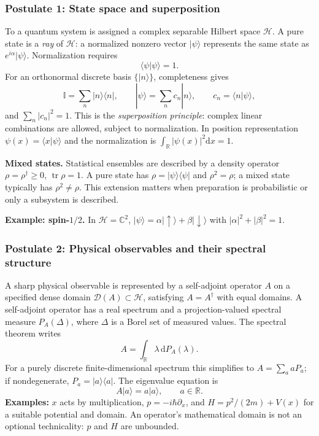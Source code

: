 \documentclass[11pt,a4paper]{article}
\newcommand{\dd}{\mathrm{d}}
\newcommand{\Hil}{\mathcal H}
\newcommand{\Dom}{\mathcal D}
\newcommand{\R}{\mathbb R}
\newcommand{\C}{\mathbb C}
\newcommand{\id}{\mathbb I}
\newcommand{\tr}{\operatorname{tr}}
\begin{document}
\subsubsection{Postulate 1: State space and superposition}
To a quantum system is assigned a complex separable Hilbert space $\Hil$. A pure state is a \emph{ray} of $\Hil$: a normalized nonzero vector $|\psi\rangle$ represents the same state as $e^{i\alpha}|\psi\rangle$. Normalization requires
\begin{equation}\boxed{\langle\psi|\psi\rangle=1}.
\end{equation}
For an orthonormal discrete basis $\{|n\rangle\}$, completeness gives
\begin{equation}
\id=\sum_n|n\rangle\langle n|,\qquad
|\psi\rangle=\sum_n c_n|n\rangle,\qquad c_n=\langle n|\psi\rangle,
\end{equation}
and $\sum_n|c_n|^2=1$. This is the \emph{superposition principle}: complex linear combinations are allowed, subject to normalization. In position representation $\psi(x)=\langle x|\psi\rangle$ and the normalization is $\int_{\R}|\psi(x)|^2\dd x=1$.
\par\textbf{Mixed states.} Statistical ensembles are described by a density operator $\rho=\rho^\dagger\ge0$, $\tr\rho=1$. A pure state has $\rho=|\psi\rangle\langle\psi|$ and $\rho^2=\rho$; a mixed state typically has $\rho^2\ne\rho$. This extension matters when preparation is probabilistic or only a subsystem is described.
\par\textbf{Example: spin-$1/2$.} In $\Hil=\C^2$, $|\psi\rangle=\alpha|\uparrow\rangle+\beta|\downarrow\rangle$ with $|\alpha|^2+|\beta|^2=1$.

\subsubsection{Postulate 2: Physical observables and their spectral structure}
A sharp physical observable is represented by a self-adjoint operator $A$ on a specified dense domain $\Dom(A)\subset\Hil$, satisfying $A=A^\dagger$ with equal domains. A self-adjoint operator has a real spectrum and a projection-valued spectral measure $P_A(\Delta)$, where $\Delta$ is a Borel set of measured values. The spectral theorem writes
\begin{equation}
\boxed{A=\int_{\R}\lambda\,\dd P_A(\lambda)}.
\end{equation}
For a purely discrete finite-dimensional spectrum this simplifies to $A=\sum_a aP_a$; if nondegenerate, $P_a=|a\rangle\langle a|$. The eigenvalue equation is
\begin{equation}A|a\rangle=a|a\rangle,\qquad a\in\R.
\end{equation}
\textbf{Examples:} $x$ acts by multiplication, $p=-i\hbar\partial_x$, and $H=p^2/(2m)+V(x)$ for a suitable potential and domain. An operator's mathematical domain is not an optional technicality: $p$ and $H$ are unbounded.
\end{document}
